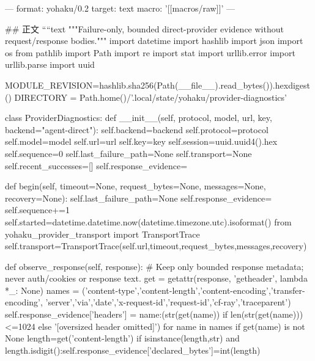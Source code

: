---
format: yohaku/0.2
target: text
macro: '[[macros/raw]]'
---

## 正文
````text
"""Failure-only, bounded direct-provider evidence without request/response bodies."""
import datetime
import hashlib
import json
import os
from pathlib import Path
import re
import stat
import urllib.error
import urllib.parse
import uuid

MODULE_REVISION=hashlib.sha256(Path(__file__).read_bytes()).hexdigest()
DIRECTORY = Path.home()/'.local/state/yohaku/provider-diagnostics'


class ProviderDiagnostics:
    def __init__(self, protocol, model, url, key, backend="agent-direct"):
        self.backend=backend
        self.protocol=protocol
        self.model=model
        self.url=url
        self.key=key
        self.session=uuid.uuid4().hex
        self.sequence=0
        self.last_failure_path=None
        self.transport=None
        self.recent_successes=[]
        self.response_evidence={}

    def begin(self, timeout=None, request_bytes=None, messages=None, recovery=None):
        self.last_failure_path=None
        self.response_evidence={}
        self.sequence+=1
        self.started=datetime.datetime.now(datetime.timezone.utc).isoformat()
        from yohaku_provider_transport import TransportTrace
        self.transport=TransportTrace(self.url,timeout,request_bytes,messages,recovery)

    def observe_response(self, response):
        # Keep only bounded response metadata; never auth/cookies or response text.
        get = getattr(response, 'getheader', lambda *_: None)
        names = ('content-type','content-length','content-encoding','transfer-encoding',
                 'server','via','date','x-request-id','request-id','cf-ray','traceparent')
        self.response_evidence['headers'] = {name:(str(get(name)) if len(str(get(name)))<=1024 else '[oversized header omitted]') for name in names if get(name) is not None}
        length=get('content-length')
        if isinstance(length,str) and length.isdigit():self.response_evidence['declared_bytes']=int(length)

